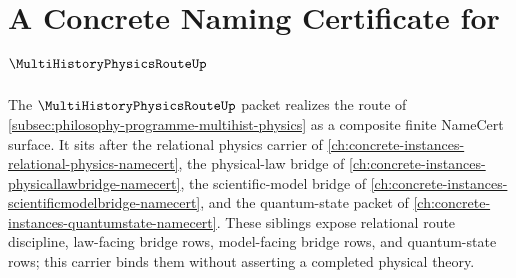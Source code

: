 \chapter{A Concrete Naming Certificate for $\MultiHistoryPhysicsRouteUp$}
\label{ch:concrete-instances-multi-history-physics-route-namecert}

The $\MultiHistoryPhysicsRouteUp$ packet realizes the route of \autoref{subsec:philosophy-programme-multihist-physics} as a composite finite NameCert surface. It sits after the relational physics carrier of \autoref{ch:concrete-instances-relational-physics-namecert}, the physical-law bridge of \autoref{ch:concrete-instances-physicallawbridge-namecert}, the scientific-model bridge of \autoref{ch:concrete-instances-scientificmodelbridge-namecert}, and the quantum-state packet of \autoref{ch:concrete-instances-quantumstate-namecert}. These siblings expose relational route discipline, law-facing bridge rows, model-facing bridge rows, and quantum-state rows; this carrier binds them without asserting a completed physical theory.

